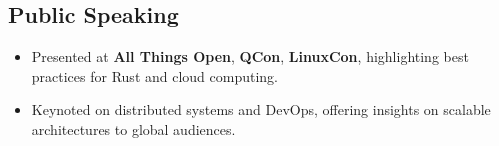 \documentclass[margin,line]{resume}
\begin{document}
\begin{resume}
\vspace{10pt}

\section{Public Speaking}
\begin{itemize}[leftmargin=0.5cm]
    \item Presented at \textbf{All Things Open}, \textbf{QCon}, \textbf{LinuxCon}, highlighting best practices for Rust and cloud computing.
    \item Keynoted on distributed systems and DevOps, offering insights on scalable architectures to global audiences.
\end{itemize}

\end{resume}
\end{document}
